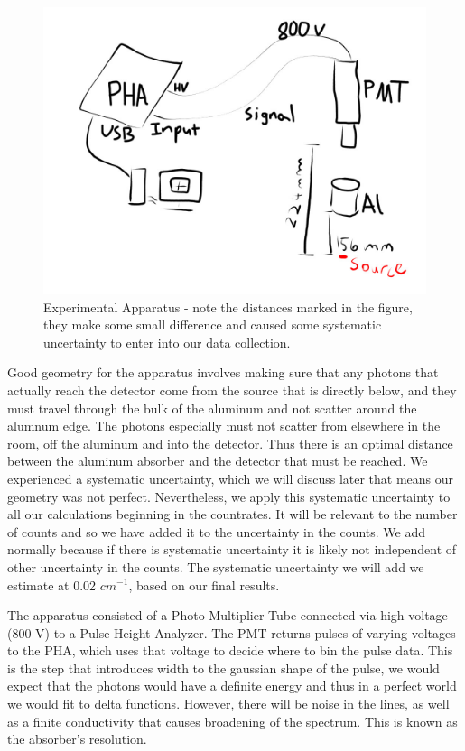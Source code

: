 \documentclass{article}
\newenvironment{tightcenter}{%
  \setlength\topsep{0pt}
  \setlength\parskip{0pt}
  \begin{center}
}{%
  \end{center}
}
\begin{document}
	\hspace{1cm}

	\begin{tightcenter}
	\begin{figure}[!htb]
		\centering
		\includegraphics[scale=.3]{paint.jpg}
		\caption{Experimental Apparatus - note the distances marked in the figure, they make some small difference and caused some systematic uncertainty to enter into our data collection.}
	\end{figure}
	\end{tightcenter}

	\begin{flushleft}
	Good geometry for the apparatus involves making sure that any photons that actually reach the detector come from the source that is directly below, and they must travel through the bulk of the aluminum and not scatter around the alumnum edge.  The photons especially must not scatter from elsewhere in the room, off the aluminum and into the detector.  Thus there is an optimal distance between the aluminum absorber and the detector that must be reached.  We experienced a systematic uncertainty, which we will discuss later that means our geometry was not perfect.  Nevertheless, we apply this systematic uncertainty to all our calculations beginning in the countrates.  It will be relevant to the number of counts and so we have added it to the uncertainty in the counts.  We add normally because if there is systematic uncertainty it is likely not independent of other uncertainty in the counts.  The systematic uncertainty we will add we estimate at 0.02 $cm^{-1}$, based on our final results.

	\vspace{.25cm}
	
	The apparatus consisted of a Photo Multiplier Tube connected via high voltage (800 V) to a Pulse Height Analyzer.  The PMT returns pulses of varying voltages to the PHA, which uses that voltage to decide where to bin the pulse data.  This is the step that introduces width to the gaussian shape of the pulse, we would expect that the photons would have a definite energy and thus in a perfect world we would fit to delta functions.  However, there will be noise in the lines, as well as a finite conductivity that causes broadening of the spectrum.  This is known as the absorber's resolution.
	\end{flushleft}
\end{document}
